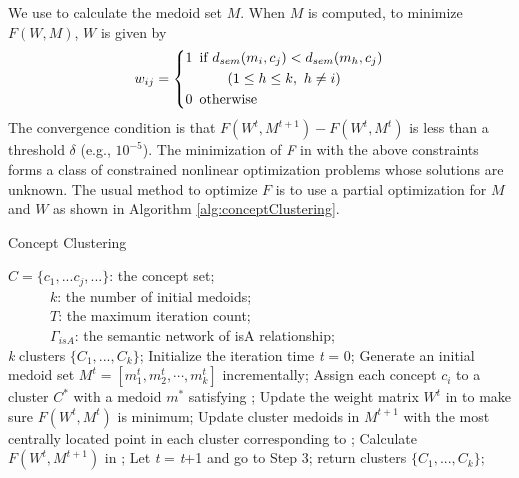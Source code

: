 We use  to calculate the medoid set $M$.
When $M$ is computed, to minimize $F(W, M)$, $W$ is given by
\begin{equation}
\label{eq:weight}
\noindent {w_{ij} = \left\{
\begin{aligned}
1 & \hspace*{5pt} \mbox{if}~ d_{sem}(m_{i},c_{j}) < d_{sem}(m_{h},c_{j})\\
 & \hspace*{25pt} (1 \leq h \leq k,~h \neq i)\\
0 & \hspace*{5pt} \mbox{otherwise}
\end{aligned}
\right.}
\end{equation}
The convergence condition is that $F(W^{t}, M^{t+1})- F(W^{t}, M^{t})$
is less than a threshold $\delta$ (e.g., $10^{-5}$). The minimization
of \emph{F} in  with the above constraints
forms a class of constrained nonlinear optimization problems whose
solutions are unknown. The usual method to optimize $F$ is to use a
partial optimization for $M$ and $W$ as shown in Algorithm
\ref{alg:conceptClustering}.

\renewcommand\algorithmicrequire{\textbf{Input:}}
\renewcommand\algorithmicensure {\textbf{Output:}}
\begin{algorithm}[th]
\caption{Concept Clustering}
\label{alg:conceptClustering}
\begin{algorithmic}[1]
\REQUIRE $C=\{c_{1}, ...c_{j},...\}$: the concept set;\\
~~~~~~$k$: the number of initial medoids;\\
~~~~~~$T$: the maximum iteration count; \\
~~~~~~$\Gamma_{isA}$: the semantic network of isA relationship;\\
\ENSURE \emph{k} clusters $\{C_{1}, ..., C_{k}\}$;
\STATE Initialize the iteration time \emph{t} = 0;
\STATE Generate an initial medoid set $M^{t}=[m_{1}^{t}, m_{2}^{t}, \cdots, m_{k}^{t}]$ incrementally;
\STATE Assign each concept $c_{i}$ to a cluster $C^{*}$ with a medoid $m^{*}$ satisfying
;
\STATE Update the weight matrix $W^{t}$ in  to make sure $F(W^t, M^t)$ is minimum;
\STATE Update cluster medoids in $M^{t+1}$ with the most centrally located point in each cluster corresponding to ;
\STATE Calculate $F(W^t, M^{t+1})$ in ;
\STATE Let \emph{t} = \emph{t}+1 and go to Step 3;
\ENDIF
\STATE return clusters $\{C_{1}, ..., C_{k}\}$;
\end{algorithmic}
\end{algorithm}

